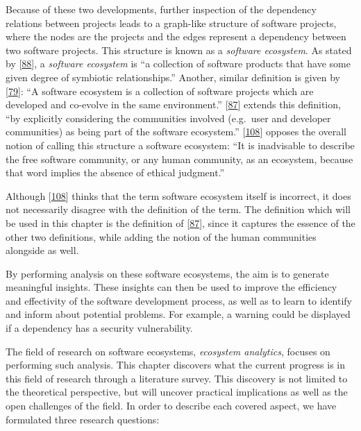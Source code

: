 \documentclass[]{book}
\begin{document}
Because of these two developments, further inspection of the dependency
relations between projects leads to a graph-like structure of software
projects, where the nodes are the projects and the edges represent a
dependency between two software projects. This structure is known as a
\emph{software ecosystem}. As stated by
{[}\protect\hyperlink{ref-Messerschmitt2003}{88}{]}, a \emph{software
ecosystem} is ``a collection of software products that have some given
degree of symbiotic relationships.'' Another, similar definition is
given by {[}\protect\hyperlink{ref-Lungu2009}{79}{]}: ``A software
ecosystem is a collection of software projects which are developed and
co-evolve in the same environment.''
{[}\protect\hyperlink{ref-Mens2013}{87}{]} extends this definition, ``by
explicitly considering the communities involved (e.g.~user and developer
communities) as being part of the software ecosystem.''
{[}\protect\hyperlink{ref-Stallman2002}{108}{]} opposes the overall
notion of calling this structure a software ecosystem: ``It is
inadvisable to describe the free software community, or any human
community, as an ecosystem, because that word implies the absence of
ethical judgment.''

Although {[}\protect\hyperlink{ref-Stallman2002}{108}{]} thinks that the
term software ecosystem itself is incorrect, it does not necessarily
disagree with the definition of the term. The definition which will be
used in this chapter is the definition of
{[}\protect\hyperlink{ref-Mens2013}{87}{]}, since it captures the
essence of the other two definitions, while adding the notion of the
human communities alongside as well.

By performing analysis on these software ecosystems, the aim is to
generate meaningful insights. These insights can then be used to improve
the efficiency and effectivity of the software development process, as
well as to learn to identify and inform about potential problems. For
example, a warning could be displayed if a dependency has a security
vulnerability.

The field of research on software ecosystems, \emph{ecosystem
analytics}, focuses on performing such analysis. This chapter discovers
what the current progress is in this field of research through a
literature survey. This discovery is not limited to the theoretical
perspective, but will uncover practical implications as well as the open
challenges of the field. In order to describe each covered aspect, we
have formulated three research questions:
\end{document}
